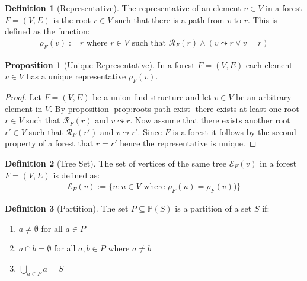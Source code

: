 \documentclass[a4paper,12pt]{article}
\theoremstyle{definition}
\newtheorem{definition}{Definition}[section]
\newtheorem{proposition}{Proposition}[section]
\begin{document}
\begin{definition}[Representative]
    The representative of an element $v \in V$ in a forest $F = (V, E)$ is the
    root $r \in V$ such that there is a path from $v$ to $r$. This is defined as
    the function:
    \begin{align*}
        \rho_F(v) := r \text{ where } r \in V \text{ such that } \mathcal{R}_F(r) \land (v \leadsto r \lor v = r)
    \end{align*}
\end{definition}

\begin{proposition}[Unique Representative]
    In a forest $F = (V, E)$ each element $v \in V$ has a unique
    representative $\rho_F(v)$.
\end{proposition}

\begin{proof}
    Let $F = (V, E)$ be a union-find structure and let $v \in V$ be an arbitrary
    element in $V$. By proposition \ref{prop:roots-path-exist} there exists at
    least one root $r \in V$ such that $\mathcal{R}_F(r)$ and $v \leadsto r$.
    Now assume that there exists another root $r' \in V$ such that $\mathcal{R}_F(r')$
    and $v \leadsto r'$. Since $F$ is a forest it follows by the second property
    of a forest that $r = r'$ hence the representative is unique.
\end{proof}

\begin{definition}[Tree Set]
    The set of vertices of the same tree $\mathcal{E}_F(v)$ in a
    forest $F = (V, E)$ is defined as:
    \begin{align*}
        \mathcal{E}_F(v) := \{u : u \in V \text{ where } \rho_F(u) = \rho_F(v))\}
    \end{align*}
\end{definition}

\begin{definition}[Partition]\label{def:partition}
    The set $P \subseteq \mathbb{P}(S)$ is a partition of a set $S$ if:
    \begin{enumerate}
        \item $a \neq \emptyset$ for all $a \in P$
        \item $a \cap b = \emptyset$ for all $a, b \in P$ where $a
        \neq b$
        \item $\bigcup_{a \in P} a = S$
    \end{enumerate}
\end{definition}
\end{document}
